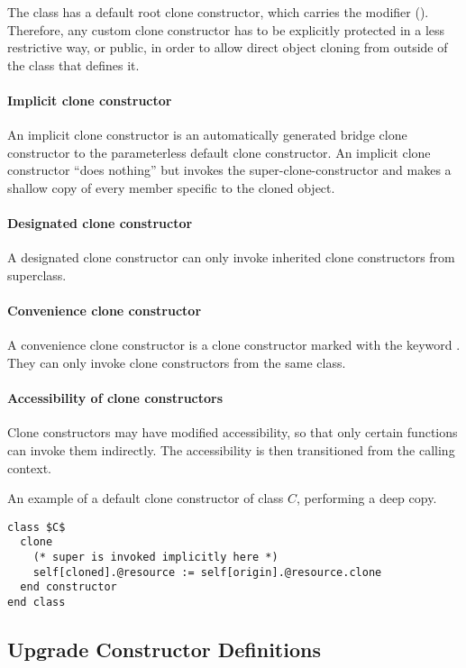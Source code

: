 The  class has a default root clone constructor, which carries the modifier  (). Therefore, any custom clone constructor has to be explicitly protected in a less restrictive way, or public, in order to allow direct object cloning from outside of the class that defines it. 

\paragraph{Implicit clone constructor}
An implicit clone constructor is an automatically generated bridge clone constructor to the parameterless default clone constructor. An implicit clone constructor ``does nothing'' but invokes the super-clone-constructor and makes a shallow copy of every member specific to the cloned object. 

\paragraph{Designated clone constructor}
A designated clone constructor can only invoke inherited clone constructors from superclass. 

\paragraph{Convenience clone constructor}
A convenience clone constructor is a clone constructor marked with the keyword . They can only invoke clone constructors from the same class. 

\paragraph{Accessibility of clone constructors}
Clone constructors may have modified accessibility, so that only certain functions can invoke them indirectly. The accessibility is then transitioned from the calling context. 

\example An example of a default clone constructor of class $C$, performing a deep copy. 
\begin{lstlisting}
class $C$
  clone
    (* super is invoked implicitly here *)
    self[cloned].@resource := self[origin].@resource.clone
  end constructor
end class
\end{lstlisting}





\subsection{Upgrade Constructor Definitions}
\label{sec:upgrade-def}

